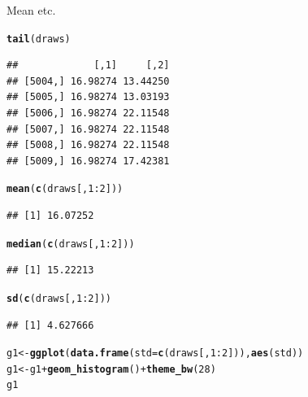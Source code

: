 \documentclass{article}\usepackage[]{graphicx}\usepackage[]{color}
\makeatletter
\newcommand{\hlnum}[1]{\textcolor[rgb]{0.686,0.059,0.569}{#1}}%
\newcommand{\hlopt}[1]{\textcolor[rgb]{0,0,0}{#1}}%
\newcommand{\hlstd}[1]{\textcolor[rgb]{0.345,0.345,0.345}{#1}}%
\newcommand{\hlkwb}[1]{\textcolor[rgb]{0.69,0.353,0.396}{#1}}%
\newcommand{\hlkwc}[1]{\textcolor[rgb]{0.333,0.667,0.333}{#1}}%
\newcommand{\hlkwd}[1]{\textcolor[rgb]{0.737,0.353,0.396}{\textbf{#1}}}%
\newenvironment{kframe}{%
 \def\at@end@of@kframe{}%
 \ifinner\ifhmode%
  \def\at@end@of@kframe{\end{minipage}}%
  \begin{minipage}{\columnwidth}%
 \fi\fi%
 \def\FrameCommand##1{\hskip\@totalleftmargin \hskip-\fboxsep
 \colorbox{shadecolor}{##1}\hskip-\fboxsep
     \hskip-\linewidth \hskip-\@totalleftmargin \hskip\columnwidth}%
 \MakeFramed {\advance\hsize-\width
   \@totalleftmargin\z@ \linewidth\hsize
   \@setminipage}}%
 {\par\unskip\endMakeFramed%
 \at@end@of@kframe}
\newenvironment{knitrout}{}{} %
\makeatother
\begin{document}
Mean etc.

\begin{knitrout}
\color{fgcolor}\begin{kframe}
\begin{alltt}
\hlkwd{tail}\hlstd{(draws)}
\end{alltt}
\begin{verbatim}
##             [,1]     [,2]
## [5004,] 16.98274 13.44250
## [5005,] 16.98274 13.03193
## [5006,] 16.98274 22.11548
## [5007,] 16.98274 22.11548
## [5008,] 16.98274 22.11548
## [5009,] 16.98274 17.42381
\end{verbatim}
\begin{alltt}
\hlkwd{mean}\hlstd{(}\hlkwd{c}\hlstd{(draws[,} \hlnum{1}\hlopt{:}\hlnum{2}\hlstd{]))}
\end{alltt}
\begin{verbatim}
## [1] 16.07252
\end{verbatim}
\begin{alltt}
\hlkwd{median}\hlstd{(}\hlkwd{c}\hlstd{(draws[,} \hlnum{1}\hlopt{:}\hlnum{2}\hlstd{]))}
\end{alltt}
\begin{verbatim}
## [1] 15.22213
\end{verbatim}
\begin{alltt}
\hlkwd{sd}\hlstd{(}\hlkwd{c}\hlstd{(draws[,} \hlnum{1}\hlopt{:}\hlnum{2}\hlstd{]))}
\end{alltt}
\begin{verbatim}
## [1] 4.627666
\end{verbatim}
\begin{alltt}
\hlstd{g1} \hlkwb{<-} \hlkwd{ggplot}\hlstd{(}\hlkwd{data.frame}\hlstd{(}\hlkwc{std} \hlstd{=} \hlkwd{c}\hlstd{(draws[,} \hlnum{1}\hlopt{:}\hlnum{2}\hlstd{])),} \hlkwd{aes}\hlstd{(std))}
\hlstd{g1} \hlkwb{<-} \hlstd{g1} \hlopt{+} \hlkwd{geom_histogram}\hlstd{()} \hlopt{+} \hlkwd{theme_bw}\hlstd{(}\hlnum{28}\hlstd{)}
\hlstd{g1}
\end{alltt}



\end{kframe}
\end{knitrout}
\end{document}
